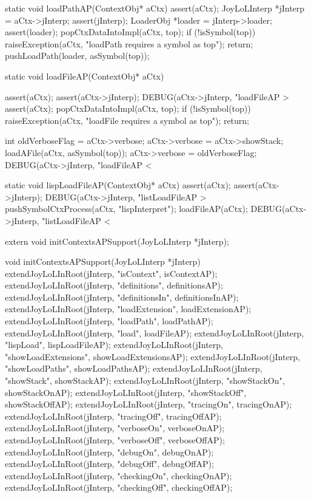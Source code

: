 \startCCode
static void loadPathAP(ContextObj* aCtx) {
  assert(aCtx);
  JoyLoLInterp *jInterp = aCtx->jInterp;
  assert(jInterp);
  LoaderObj *loader = jInterp->loader;
  assert(loader);
  popCtxDataIntoImpl(aCtx, top);
  if (!isSymbol(top)) {
    raiseException(aCtx,
      "loadPath requires a symbol as top");
    return;
  }
  pushLoadPath(loader, asSymbol(top));
}
\stopCCode

\startCCode
static void loadFileAP(ContextObj* aCtx) {
  assert(aCtx);
  assert(aCtx->jInterp);
  DEBUG(aCtx->jInterp, "loadFileAP > %
  assert(aCtx);
  popCtxDataIntoImpl(aCtx, top);
  if (!isSymbol(top)) {
    raiseException(aCtx,
      "loadFile requires a symbol as top");
    return;
  }
  
  int oldVerboseFlag = aCtx->verbose;
  aCtx->verbose = aCtx->showStack;
  loadAFile(aCtx, asSymbol(top));
  aCtx->verbose = oldVerboseFlag;
  DEBUG(aCtx->jInterp, "loadFileAP < %
}
\stopCCode

\startCCode
static void lispLoadFileAP(ContextObj* aCtx) {
  assert(aCtx);
  assert(aCtx->jInterp);
  DEBUG(aCtx->jInterp, "listLoadFileAP > %
  pushSymbolCtxProcess(aCtx, "lispInterpret");
  loadFileAP(aCtx);
  DEBUG(aCtx->jInterp, "listLoadFileAP < %
}
\stopCCode

\startCHeader
extern void initContextsAPSupport(JoyLoLInterp *jInterp);
\stopCHeader
{}

\startCCode
void initContextsAPSupport(JoyLoLInterp *jInterp) {
  extendJoyLoLInRoot(jInterp, "isContext",           isContextAP);
  extendJoyLoLInRoot(jInterp, "definitions",         definitionsAP);
  extendJoyLoLInRoot(jInterp, "definitionsIn",       definitionsInAP);
  extendJoyLoLInRoot(jInterp, "loadExtension",       loadExtensionAP);
  extendJoyLoLInRoot(jInterp, "loadPath",            loadPathAP);
  extendJoyLoLInRoot(jInterp, "load",                loadFileAP);
  extendJoyLoLInRoot(jInterp, "lispLoad",            lispLoadFileAP);
  extendJoyLoLInRoot(jInterp, "showLoadExtensions",  showLoadExtensionsAP);
  extendJoyLoLInRoot(jInterp, "showLoadPaths",       showLoadPathsAP);
  extendJoyLoLInRoot(jInterp, "showStack",           showStackAP);
  extendJoyLoLInRoot(jInterp, "showStackOn",         showStackOnAP);
  extendJoyLoLInRoot(jInterp, "showStackOff",        showStackOffAP);
  extendJoyLoLInRoot(jInterp, "tracingOn",           tracingOnAP);
  extendJoyLoLInRoot(jInterp, "tracingOff",          tracingOffAP);
  extendJoyLoLInRoot(jInterp, "verboseOn",           verboseOnAP);
  extendJoyLoLInRoot(jInterp, "verboseOff",          verboseOffAP);
  extendJoyLoLInRoot(jInterp, "debugOn",             debugOnAP);
  extendJoyLoLInRoot(jInterp, "debugOff",            debugOffAP);
  extendJoyLoLInRoot(jInterp, "checkingOn",          checkingOnAP);
  extendJoyLoLInRoot(jInterp, "checkingOff",         checkingOffAP);
}
\stopCCode